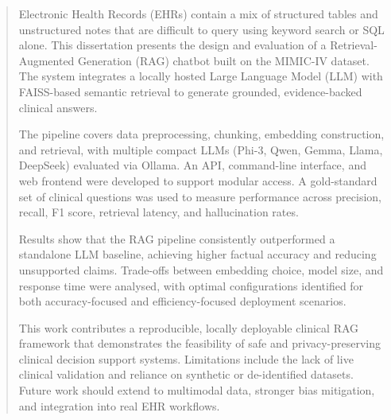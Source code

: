 \begin{abstract}
Electronic Health Records (EHRs) contain a mix of structured tables and unstructured notes that are difficult to query using keyword search or SQL alone. This dissertation presents the design and evaluation of a Retrieval-Augmented Generation (RAG) chatbot built on the MIMIC-IV dataset. The system integrates a locally hosted Large Language Model (LLM) with FAISS-based semantic retrieval to generate grounded, evidence-backed clinical answers. 

The pipeline covers data preprocessing, chunking, embedding construction, and retrieval, with multiple compact LLMs (Phi-3, Qwen, Gemma, Llama, DeepSeek) evaluated via Ollama. An API, command-line interface, and web frontend were developed to support modular access. A gold-standard set of clinical questions was used to measure performance across precision, recall, F1 score, retrieval latency, and hallucination rates. 

Results show that the RAG pipeline consistently outperformed a standalone LLM baseline, achieving higher factual accuracy and reducing unsupported claims. Trade-offs between embedding choice, model size, and response time were analysed, with optimal configurations identified for both accuracy-focused and efficiency-focused deployment scenarios. 

This work contributes a reproducible, locally deployable clinical RAG framework that demonstrates the feasibility of safe and privacy-preserving clinical decision support systems. Limitations include the lack of live clinical validation and reliance on synthetic or de-identified datasets. Future work should extend to multimodal data, stronger bias mitigation, and integration into real EHR workflows.
\end{abstract}
